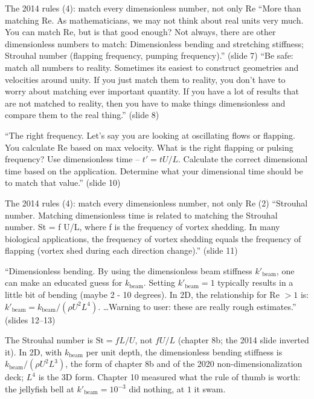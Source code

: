 \documentclass[aspectratio=169,11pt]{beamer}
\begin{document}
\begin{frame}{The 2014 rules (4): match every dimensionless number, not only Re}
\label{fr:match}
\footnotesize ``More than matching Re. As mathematicians, we may not think about real units very much. You can match Re, but is that good enough? Not always, there are other dimensionless numbers to match: Dimensionless bending and stretching stiffness; Strouhal number (flapping frequency, pumping frequency).'' (slide 7) ``Be safe: match all numbers to reality. Sometimes its easiest to construct geometries and velocities around unity. If you just match them to reality, you don't have to worry about matching ever important quantity. If you have a lot of results that are not matched to reality, then you have to make things dimensionless and compare them to the real thing.'' (slide 8)
\vspace{1mm}

\footnotesize ``The right frequency. Let's say you are looking at oscillating flows or flapping. You calculate Re based on max velocity. What is the right flapping or pulsing frequency? Use dimensionless time -- $t' = tU/L$. Calculate the correct dimensional time based on the application. Determine what your dimensional time should be to match that value.'' (slide 10)

\end{frame}

\begin{frame}{The 2014 rules (4): match every dimensionless number, not only Re (2)}
\label{fr:match2}
\footnotesize ``Strouhal number. Matching dimensionless time is related to matching the Strouhal number. St = f U/L, where f is the frequency of vortex shedding. In many biological applications, the frequency of vortex shedding equals the frequency of flapping (vortex shed during each direction change).'' (slide 11)
\vspace{1mm}

\footnotesize ``Dimensionless bending. By using the dimensionless beam stiffness $k'_{\mathrm{beam}}$, one can make an educated guess for $k_{\mathrm{beam}}$. Setting $k'_{\mathrm{beam}} = 1$ typically results in a little bit of bending (maybe 2 - 10 degrees). In 2D, the relationship for Re $> 1$ is: $k'_{\mathrm{beam}} = k_{\mathrm{beam}}/(\rho U^2 L^4)$. \ldots Warning to user: these are really rough estimates.'' (slides 12--13)
\vspace{1mm}

\scriptsize {} The Strouhal number is $\mathrm{St} = fL/U$, not $fU/L$ (chapter 8b; the 2014 slide inverted it). In 2D, with $k_{\mathrm{beam}}$ per unit depth, the dimensionless bending stiffness is $k_{\mathrm{beam}}/(\rho U^2 L^3)$, the form of chapter 8b and of the 2020 non-dimensionalization deck; $L^4$ is the 3D form. Chapter 10 measured what the rule of thumb is worth: the jellyfish bell at $k'_{\mathrm{beam}} = 10^{-3}$ did nothing, at $1$ it swam.
\end{frame}
\end{document}
